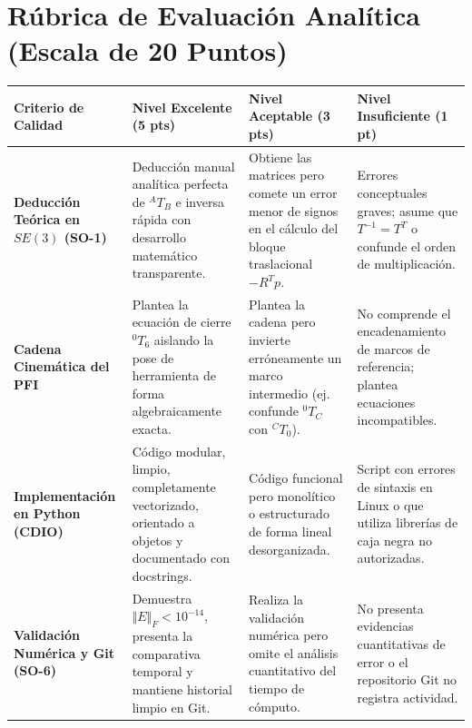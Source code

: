 \documentclass[11pt, a4paper]{article}
\begin{document}
\section{Rúbrica de Evaluación Analítica (Escala de 20 Puntos)}
\begin{table}[h!]
    \centering
    \renewcommand{\arraystretch}{1.3}
    \begin{tabularx}{\textwidth}{@{} >{\raggedright\arraybackslash}p{3cm} X X X @{}}
    \toprule
    \textbf{Criterio de Calidad} & \textbf{Nivel Excelente (5 pts)} & \textbf{Nivel Aceptable (3 pts)} & \textbf{Nivel Insuficiente (1 pt)} \\ \midrule
    \textbf{Deducción Teórica en $SE(3)$ (SO-1)} & Deducción manual analítica perfecta de $^{A}T_B$ e inversa rápida con desarrollo matemático transparente. & Obtiene las matrices pero comete un error menor de signos en el cálculo del bloque traslacional $-R^T p$. & Errores conceptuales graves; asume que $T^{-1} = T^T$ o confunde el orden de multiplicación. \\ \addlinespace
    \textbf{Cadena Cinemática del PFI} & Plantea la ecuación de cierre $^{0}T_6$ aislando la pose de herramienta de forma algebraicamente exacta. & Plantea la cadena pero invierte erróneamente un marco intermedio (ej. confunde $^{0}T_C$ con $^{C}T_0$). & No comprende el encadenamiento de marcos de referencia; plantea ecuaciones incompatibles. \\ \addlinespace
    \textbf{Implementación en Python (CDIO)} & Código modular, limpio, completamente vectorizado, orientado a objetos y documentado con docstrings. & Código funcional pero monolítico o estructurado de forma lineal desorganizada. & Script con errores de sintaxis en Linux o que utiliza librerías de caja negra no autorizadas. \\ \addlinespace
    \textbf{Validación Numérica y Git (SO-6)} & Demuestra $\Vert E \Vert_F < 10^{-14}$, presenta la comparativa temporal y mantiene historial limpio en Git. & Realiza la validación numérica pero omite el análisis cuantitativo del tiempo de cómputo. & No presenta evidencias cuantitativas de error o el repositorio Git no registra actividad. \\ \bottomrule
    \end{tabularx}
\end{table}

\end{document}
